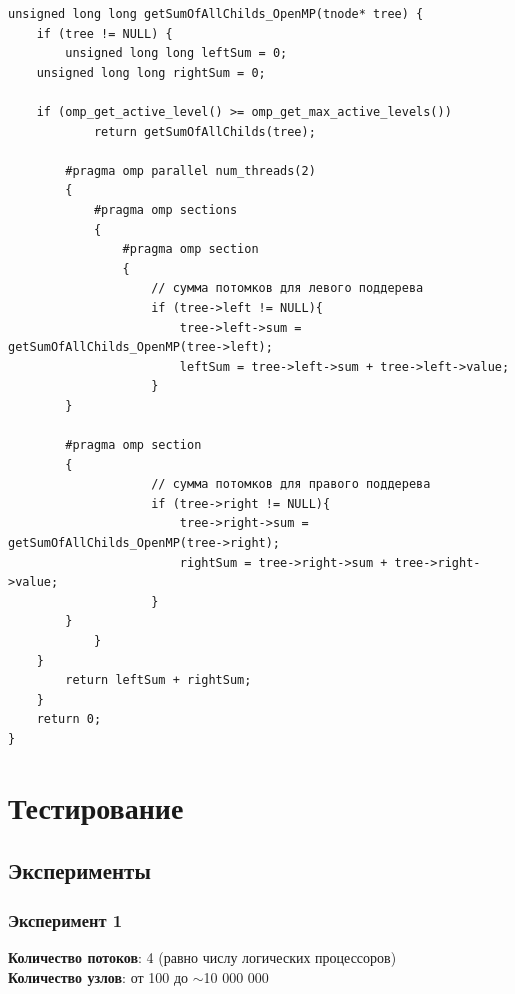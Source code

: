 \begin{lstlisting}[firstnumber=160,language={}, caption=Отрывок TreeUtils.cpp]
unsigned long long getSumOfAllChilds_OpenMP(tnode* tree) {
    if (tree != NULL) {
        unsigned long long leftSum = 0;
	unsigned long long rightSum = 0;
		
	if (omp_get_active_level() >= omp_get_max_active_levels())
            return getSumOfAllChilds(tree);

        #pragma omp parallel num_threads(2) 
        {
            #pragma omp sections
            {
                #pragma omp section 
                { 
                    // сумма потомков для левого поддерева
                    if (tree->left != NULL){
                        tree->left->sum = getSumOfAllChilds_OpenMP(tree->left);
                        leftSum = tree->left->sum + tree->left->value;
                    }
		}

		#pragma omp section 
		{ 
                    // сумма потомков для правого поддерева
                    if (tree->right != NULL){
                        tree->right->sum = getSumOfAllChilds_OpenMP(tree->right);
                        rightSum = tree->right->sum + tree->right->value;
                    }				
		} 
            }
	}
        return leftSum + rightSum;
    }
    return 0;
}
\end{lstlisting}

\section{Тестирование}
\subsection{Эксперименты}
\subsubsection{Эксперимент 1}
\textbf{Количество потоков}: 4 (равно числу логических процессоров)\\
\textbf{Количество узлов}: от 100 до $\sim$10 000 000

